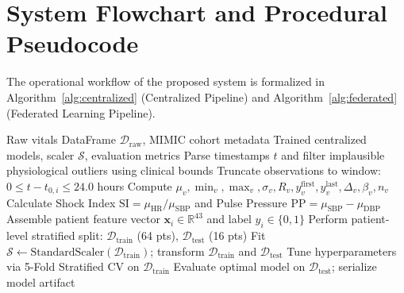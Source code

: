 \documentclass[12pt,a4paper,oneside]{report}
\begin{document}
\section{System Flowchart and Procedural Pseudocode}
\label{sec:flowchart_pseudocode}

The operational workflow of the proposed system is formalized in Algorithm~\ref{alg:centralized} (Centralized Pipeline) and Algorithm~\ref{alg:federated} (Federated Learning Pipeline).

\begin{algorithm}[htbp]
\caption{Centralized Preprocessing and Benchmark Pipeline}
\label{alg:centralized}
\begin{algorithmic}[1]
\REQUIRE Raw vitals DataFrame $\mathcal{D}_{\text{raw}}$, MIMIC cohort metadata
\ENSURE Trained centralized models, scaler $\mathcal{S}$, evaluation metrics
\STATE Parse timestamps $t$ and filter implausible physiological outliers using clinical bounds
\STATE Truncate observations to window: $0 \le t - t_{0, i} \le 24.0$ hours
        \STATE Compute $\mu_v, \min_v, \max_v, \sigma_v, R_v, y_v^{\text{first}}, y_v^{\text{last}}, \Delta_v, \beta_v, n_v$
    \ENDFOR
    \STATE Calculate Shock Index $\text{SI} = \mu_{\text{HR}}/\mu_{\text{SBP}}$ and Pulse Pressure $\text{PP} = \mu_{\text{SBP}} - \mu_{\text{DBP}}$
    \STATE Assemble patient feature vector $\mathbf{x}_i \in \mathbb{R}^{43}$ and label $y_i \in \{0, 1\}$
\ENDFOR
\STATE Perform patient-level stratified split: $\mathcal{D}_{\text{train}}$ (64 pts), $\mathcal{D}_{\text{test}}$ (16 pts)
\STATE Fit $\mathcal{S} \leftarrow \text{StandardScaler}(\mathcal{D}_{\text{train}})$; transform $\mathcal{D}_{\text{train}}$ and $\mathcal{D}_{\text{test}}$
    \STATE Tune hyperparameters via 5-Fold Stratified CV on $\mathcal{D}_{\text{train}}$
    \STATE Evaluate optimal model on $\mathcal{D}_{\text{test}}$; serialize model artifact
\ENDFOR
\end{algorithmic}
\end{algorithm}
\end{document}
